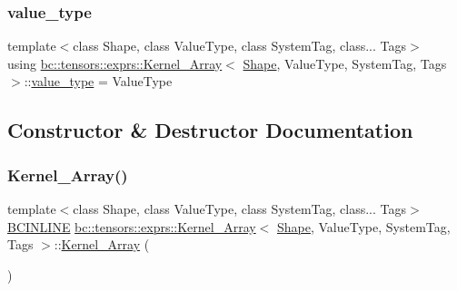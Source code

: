 \mbox{\label{structbc_1_1tensors_1_1exprs_1_1Kernel__Array_ae8195ebc960dd40b6c731a269c00e37b}} 
\subsubsection{\texorpdfstring{value\+\_\+type}{value\_type}}
{\footnotesize\ttfamily template$<$class Shape, class Value\+Type, class System\+Tag, class... Tags$>$ \\
using \hyperlink{structbc_1_1tensors_1_1exprs_1_1Kernel__Array}{bc\+::tensors\+::exprs\+::\+Kernel\+\_\+\+Array}$<$ \hyperlink{structbc_1_1Shape}{Shape}, Value\+Type, System\+Tag, Tags $>$\+::\hyperlink{structbc_1_1tensors_1_1exprs_1_1Kernel__Array_ae8195ebc960dd40b6c731a269c00e37b}{value\+\_\+type} =  Value\+Type}



\subsection{Constructor \& Destructor Documentation}
\mbox{\label{structbc_1_1tensors_1_1exprs_1_1Kernel__Array_aa95e24993611ac81660689a5f95529e4}} 
\subsubsection{\texorpdfstring{Kernel\+\_\+\+Array()}{Kernel\_Array()}\hspace{0.1cm}{\footnotesize\ttfamily [1/3]}}
{\footnotesize\ttfamily template$<$class Shape, class Value\+Type, class System\+Tag, class... Tags$>$ \\
\hyperlink{common_8h_a6699e8b0449da5c0fafb878e59c1d4b1}{B\+C\+I\+N\+L\+I\+NE} \hyperlink{structbc_1_1tensors_1_1exprs_1_1Kernel__Array}{bc\+::tensors\+::exprs\+::\+Kernel\+\_\+\+Array}$<$ \hyperlink{structbc_1_1Shape}{Shape}, Value\+Type, System\+Tag, Tags $>$\+::\hyperlink{structbc_1_1tensors_1_1exprs_1_1Kernel__Array}{Kernel\+\_\+\+Array} (\begin{DoxyParamCaption}{ }\end{DoxyParamCaption})\hspace{0.3cm}{\ttfamily [inline]}}

